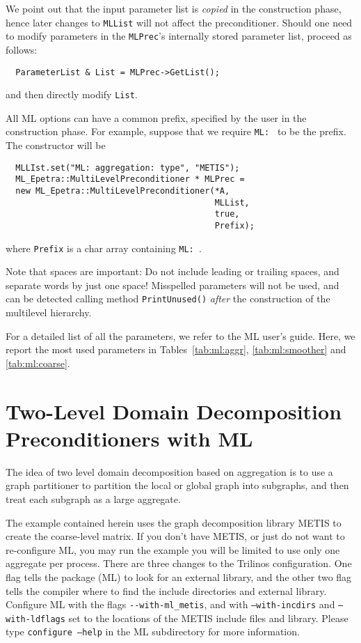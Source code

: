 We point out that the input parameter list is {\sl copied} in the
construction phase, hence later changes to \verb!MLList! will not affect
the preconditioner. Should one need to modify parameters in the
\verb!MLPrec!'s internally stored parameter list, proceed as
follows:
\begin{verbatim}
  ParameterList & List = MLPrec->GetList();
\end{verbatim}
and then directly modify \verb!List!.

\medskip

All ML options can have a common prefix, specified by the
user in the construction phase. For example, suppose that we require
\verb!ML: ! to be the prefix. The constructor will be
\begin{verbatim}
  MLLIst.set("ML: aggregation: type", "METIS");
  ML_Epetra::MultiLevelPreconditioner * MLPrec = 
  new ML_Epetra::MultiLevelPreconditioner(*A,  
                                          MLList, 
                                          true, 
                                          Prefix);
\end{verbatim}
where \verb!Prefix! is a char array containing \verb!ML: !.

Note that spaces are important: Do not include leading or trailing
spaces, and separate words by just one space! Misspelled parameters will
not be used, and can be detected calling method \verb!PrintUnused()!
{\sl after} the construction of the multilevel hierarchy. 

For a detailed list of all the parameters, we refer to the ML user's
guide.  Here, we report the most used parameters in
Tables~\ref{tab:ml:aggr}, \ref{tab:ml:smoother} and \ref{tab:ml:coarse}.




\section{Two-Level Domain Decomposition Preconditioners with ML}
\label{sec:ml_DD}

The idea of two level domain decomposition based on aggregation is to
use a graph partitioner to partition the local or global graph into
subgraphs, and then treat each subgraph as a large aggregate.

The example contained herein 
uses the graph decomposition library METIS to create the coarse-level matrix.
If you don't have METIS, or just do not want to
re-configure ML, you may run the example 
you will be limited to use only one aggregate per process.
There are three changes to the Trilinos configuration.
One flag tells the package (ML) to look for an external library,
and the other two flag tells the compiler
where to find the include directories and external library.
Configure ML with the flags \verb!--with-ml_metis!,
and with {\tt --with-incdirs} and {\tt --with-ldflags}
set to the locations of the METIS include files and library. 
Please type {\tt configure --help} in the ML subdirectory for more information. 

